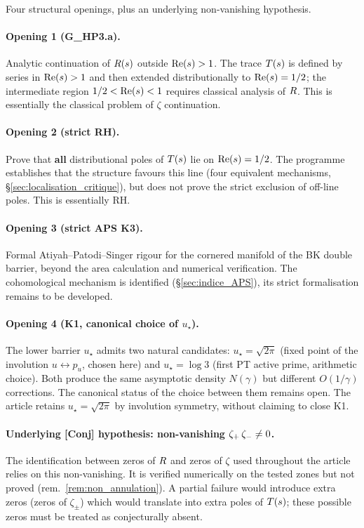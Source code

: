 Four structural openings, plus an underlying non-vanishing
hypothesis.

\paragraph{Opening 1 (G\_HP3.a).}
Analytic continuation of $R(s)$ outside $\operatorname{Re}(s) > 1$. The trace
$T(s)$ is defined by series in $\operatorname{Re}(s) > 1$ and then extended
distributionally to $\operatorname{Re}(s) = 1/2$; the intermediate region
$1/2 < \operatorname{Re}(s) < 1$ requires classical analysis of $R$. This is
essentially the classical problem of $\zeta$ continuation.

\paragraph{Opening 2 (strict RH).}
Prove that \textbf{all} distributional poles of $T(s)$ lie on
$\operatorname{Re}(s) = 1/2$. The programme establishes that the structure
favours this line (four equivalent mechanisms,
\S\ref{sec:localisation_critique}), but does not prove the strict
exclusion of off-line poles. This is essentially RH.

\paragraph{Opening 3 (strict APS K3).}
Formal Atiyah--Patodi--Singer rigour for the cornered manifold of
the BK double barrier, beyond the area calculation and numerical
verification. The cohomological mechanism is identified
(\S\ref{sec:indice_APS}), its strict formalisation remains to be
developed.

\paragraph{Opening 4 (K1, canonical choice of $u_\star$).}
The lower barrier $u_\star$ admits two natural candidates:
$u_\star = \sqrt{2\pi}$ (fixed point of the involution
$u \leftrightarrow p_u$, chosen here) and $u_\star = \log 3$
(first PT active prime, arithmetic choice). Both produce the same
asymptotic density $N(\gamma)$ but different $O(1/\gamma)$
corrections. The canonical status of the choice between them remains
open. The article retains $u_\star = \sqrt{2\pi}$ by involution
symmetry, without claiming to close K1.

\paragraph{Underlying \textbf{[Conj]} hypothesis: non-vanishing $\zeta_{+}\,\zeta_{-} \ne 0$.}
The identification between zeros of $R$ and zeros of $\zeta$
used throughout the article relies on this non-vanishing. It is
verified numerically on the tested zones but not proved
(rem.~\ref{rem:non_annulation}). A partial failure would introduce
extra zeros (zeros of $\zeta_\pm$) which would translate into extra
poles of $T(s)$; these possible zeros must be treated as
conjecturally absent.

